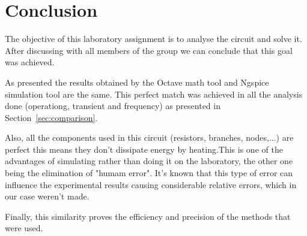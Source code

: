 \newpage
\section{Conclusion}
\label{sec:conclusion}


The objective of this laboratory assignment is to analyse the circuit and solve it. After discussing with all members of the group we can conclude that this goal was achieved.

As presented the results obtained by the Octave math tool and Ngspice simulation tool are the same. This perfect match was achieved in all the analysis done (operationg, transient and frequency) as presented in Section~\ref{sec:comparison}.

Also, all the components used in this circuit (resistors, branches, nodes,...) are perfect this means they don't dissipate energy by heating.This is one of the advantages of simulating rather than doing it on the laboratory, the other one being the elimination of "humam error". It's known that this type of error can influence the experimental results causing considerable relative errors, which in our case weren't made.

Finally, this similarity proves the efficiency and precision of the methods that were used.


